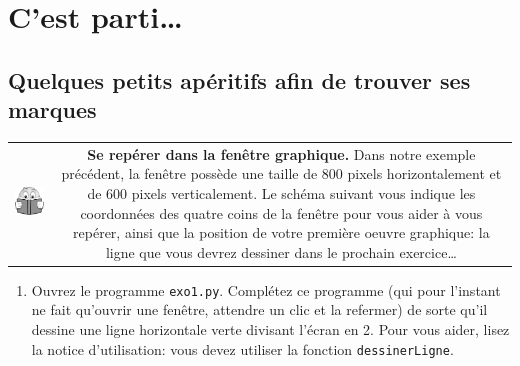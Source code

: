 \documentclass[11pt,a4paper]{article}
\newcommand{\checkbox}{$\square$ \smallskip}
\newenvironment{lecture}{%
\smallskip
\begin{tabular}{c|c}
    \hspace{.03\textwidth} \includegraphics[width=.07\textwidth]{img/lecture.jpg} & 
\begin{minipage}{.85\textwidth}
}{%
\end{minipage}
\end{tabular}
}
\newcounter{exo} \setcounter{exo}{0}
\newenvironment{action}{%
    \begin{enumerate}[\numerotation] \addtocounter{exo}{-1}%
        }{%
    \end{enumerate}
}
\newcommand{\numexoa}{\theexo \addtocounter{exo}{1}}
\newcommand{\numerotation}{\checkbox \smallskip \numexoa.}
\newcounter{exoo} \setcounter{exoo}{0}
\newcommand{\exoplus}{\addtocounter{exoo}{1}}
\begin{document}
\section*{C'est parti\dots}
\subsection*{Quelques petits apéritifs afin de trouver ses marques}
\begin{lecture}
{\bf Se repérer dans la fenêtre graphique.} Dans notre exemple précédent, la fenêtre possède une taille de 800 pixels horizontalement et de 600 pixels verticalement. Le schéma suivant vous indique les coordonnées des quatre coins de la fenêtre pour vous aider à vous repérer, ainsi que la position de votre première oeuvre graphique: la ligne que vous devrez dessiner dans le prochain exercice\dots
\end{lecture}

\begin{center}
    
\end{center}

\begin{action}
\item \exoplus {\bf Ligne horizontale} Ouvrez le programme {\tt exo1.py}.  Complétez ce programme (qui pour l'instant ne fait qu'ouvrir une fenêtre, attendre un clic et la refermer) de sorte qu'il dessine une ligne horizontale verte divisant l'écran en 2. Pour vous aider, lisez la notice d'utilisation: vous devez utiliser la fonction {\tt dessinerLigne}.
\end{action}
\end{document}
